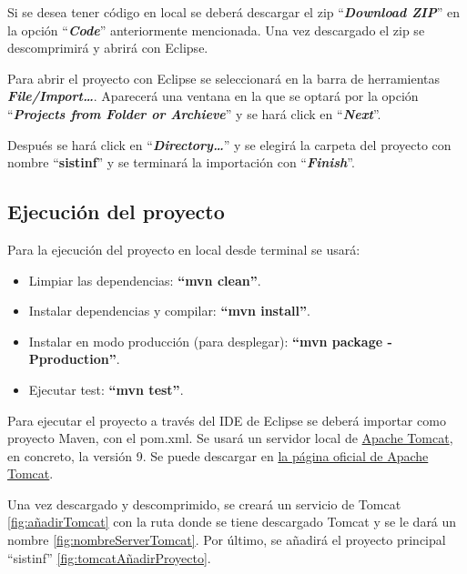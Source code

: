 Si se desea tener código en local se deberá descargar el zip ``\textbf{\textit{Download ZIP}}'' en la opción ``\textbf{\textit{Code}}'' anteriormente mencionada. Una vez descargado el zip se descomprimirá y abrirá con Eclipse. 

Para abrir el proyecto con Eclipse se seleccionará en la barra de herramientas \textbf{\textit{File/Import\dots}}. Aparecerá una ventana en la que se optará por la opción ``\textbf{\textit{Projects from Folder or Archieve}}'' y se hará click en ``\textbf{\textit{Next}}''.

Después se hará click en ``\textbf{\textit{Directory\dots}}'' y se elegirá la carpeta del proyecto con nombre ``\textbf{sistinf}'' y se terminará la importación con ``\textbf{\textit{Finish}}''.
	
\subsection{Ejecución del proyecto}

Para la ejecución del proyecto en local desde terminal se usará:
\begin{itemize}
	\item Limpiar las dependencias: \textbf{``mvn clean''}.
	\item Instalar dependencias y compilar: \textbf{``mvn install''}.
	\item Instalar en modo producción (para desplegar): \textbf{``mvn package -Pproduction''}.  
	\item Ejecutar test: \textbf{``mvn test''}.	
\end{itemize}

Para ejecutar el proyecto a través del IDE de Eclipse se deberá importar como proyecto Maven, con el pom.xml. Se usará un servidor local de \href{https://tomcat.apache.org/download-90.cgi}{Apache Tomcat}, en concreto, la versión 9. Se puede descargar en \href{https://tomcat.apache.org/download-90.cgi}{la página oficial de Apache Tomcat}.

Una vez descargado y descomprimido, se creará un servicio de Tomcat \ref{fig:añadirTomcat} con la ruta donde se tiene descargado Tomcat y se le dará un nombre \ref{fig:nombreServerTomcat}. Por último, se añadirá el proyecto principal ``sistinf'' \ref{fig:tomcatAñadirProyecto}.



